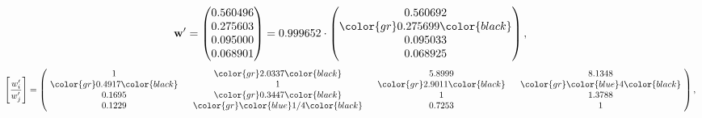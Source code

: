 \begin{example}
\begin{equation*}
\mathbf{w}^{\prime} =
\begin{pmatrix}
0.560496\\
0.275603\\
0.095000\\
0.068901
\end{pmatrix} =
0.999652\cdot
\begin{pmatrix}
0.560692\\
\color{gr} 0.275699\color{black} \\
0.095033\\
0.068925
\end{pmatrix},
\end{equation*}
\begin{equation*}
\left[ \frac{{w}^{\prime}_i}{{w}^{\prime}_j} \right] =
\begin{pmatrix}
$\,\,$ 1 $\,\,$ & $\,\,$\color{gr} 2.0337\color{black} $\,\,$ & $\,\,$5.8999$\,\,$ & $\,\,$8.1348$\,\,$ \\
$\,\,$\color{gr} 0.4917\color{black} $\,\,$ & $\,\,$ 1 $\,\,$ & $\,\,$\color{gr} 2.9011\color{black} $\,\,$ & $\,\,$\color{gr} \color{blue} 4\color{black}   $\,\,$ \\
$\,\,$0.1695$\,\,$ & $\,\,$\color{gr} 0.3447\color{black} $\,\,$ & $\,\,$ 1 $\,\,$ & $\,\,$1.3788 $\,\,$ \\
$\,\,$0.1229$\,\,$ & $\,\,$\color{gr} \color{blue}  1/4\color{black} $\,\,$ & $\,\,$0.7253$\,\,$ & $\,\,$ 1  $\,\,$ \\
\end{pmatrix},
\end{equation*}
\end{example}
\newpage
